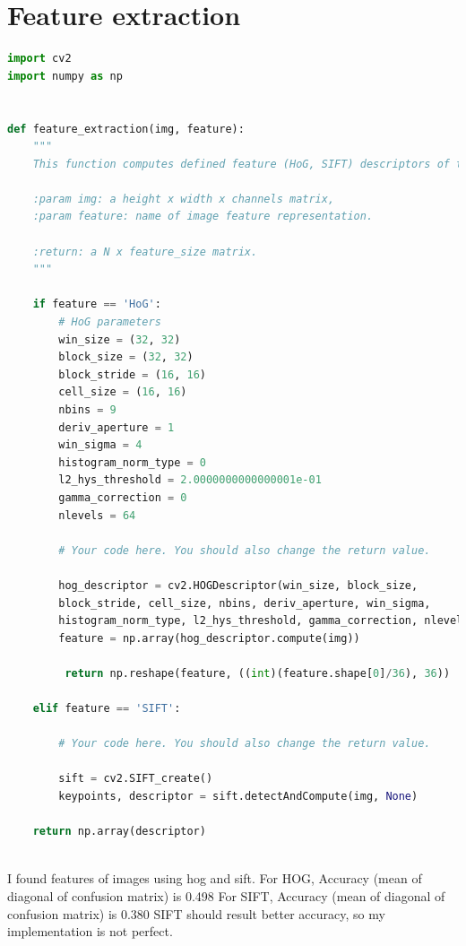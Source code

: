 \section*{Feature extraction}
\begin{lstlisting}[language=Python]
import cv2
import numpy as np


def feature_extraction(img, feature):
    """
    This function computes defined feature (HoG, SIFT) descriptors of the target image.
	
    :param img: a height x width x channels matrix,
    :param feature: name of image feature representation.
	
    :return: a N x feature_size matrix.
    """
	
    if feature == 'HoG':
        # HoG parameters
        win_size = (32, 32)
        block_size = (32, 32)
        block_stride = (16, 16)
        cell_size = (16, 16)
        nbins = 9
        deriv_aperture = 1
        win_sigma = 4
        histogram_norm_type = 0
        l2_hys_threshold = 2.0000000000000001e-01
        gamma_correction = 0
        nlevels = 64
		
        # Your code here. You should also change the return value.
		
        hog_descriptor = cv2.HOGDescriptor(win_size, block_size, 
        block_stride, cell_size, nbins, deriv_aperture, win_sigma, 
        histogram_norm_type, l2_hys_threshold, gamma_correction, nlevels)
        feature = np.array(hog_descriptor.compute(img))
		
         return np.reshape(feature, ((int)(feature.shape[0]/36), 36))
	
    elif feature == 'SIFT':
	
        # Your code here. You should also change the return value.
		
        sift = cv2.SIFT_create()
        keypoints, descriptor = sift.detectAndCompute(img, None)
	
    return np.array(descriptor)
		
\end{lstlisting}

	I found features of images using hog and sift. 
	For HOG, Accuracy (mean of diagonal of confusion matrix) is 0.498
	For SIFT, Accuracy (mean of diagonal of confusion matrix) is 0.380
	SIFT should result better accuracy, so my implementation is not perfect. 

